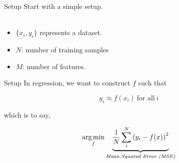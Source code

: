 
\begin{frame}{Setup}
Start with a simple setup. \\~\\

\begin{itemize}
\item $\{ x_i, y_i \}$ represents a dataset.
\item $N$: number of training samples
\item $M$: number of features.
\end{itemize}
\end{frame}
%

\begin{frame}{Setup}
In regression, we want to construct $f$ such that

$$ y_i \approx f(x_i) \ \text{for all} \ i $$

which is to say,

$$\operatorname*{arg\,min}_{f} \underbrace{\frac{1}{N}\sum_i  ^ N\left( y_i - f(x) \right)^2}_{\textit{Mean Squared Error (MSE)}}$$

\end{frame}
%

